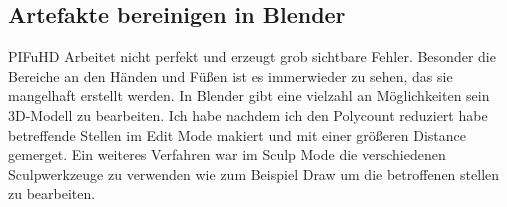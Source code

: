 \subsection{Artefakte bereinigen in Blender}%
PIFuHD Arbeitet nicht perfekt und erzeugt grob sichtbare Fehler. Besonder die Bereiche an den Händen und Füßen ist es immerwieder zu sehen, das sie mangelhaft erstellt werden. In Blender gibt eine vielzahl an Möglichkeiten sein 3D-Modell zu bearbeiten. Ich habe nachdem ich den Polycount reduziert habe betreffende Stellen im Edit Mode makiert und mit einer größeren Distance gemerget. Ein weiteres Verfahren war im Sculp Mode die verschiedenen Sculpwerkzeuge zu verwenden wie zum Beispiel Draw um die betroffenen stellen zu bearbeiten.

